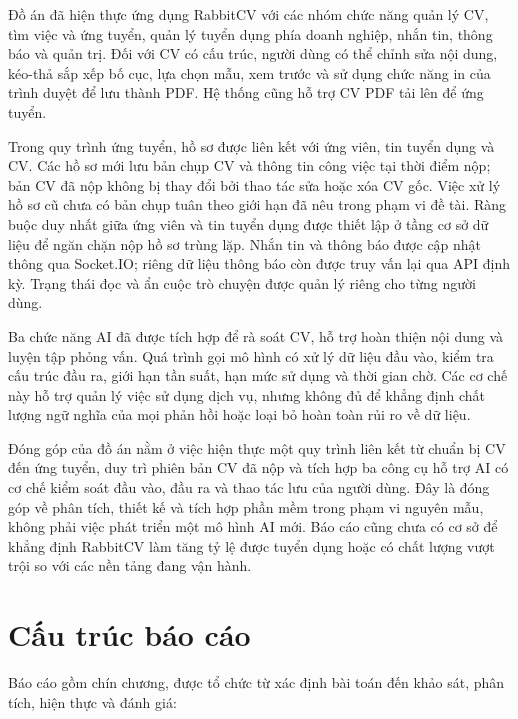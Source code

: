 Đồ án đã hiện thực ứng dụng RabbitCV với các nhóm chức năng quản lý CV, tìm việc và ứng tuyển, quản lý tuyển dụng phía doanh nghiệp, nhắn tin, thông báo và quản trị. Đối với CV có cấu trúc, người dùng có thể chỉnh sửa nội dung, kéo-thả sắp xếp bố cục, lựa chọn mẫu, xem trước và sử dụng chức năng in của trình duyệt để lưu thành PDF. Hệ thống cũng hỗ trợ CV PDF tải lên để ứng tuyển.

Trong quy trình ứng tuyển, hồ sơ được liên kết với ứng viên, tin tuyển dụng và CV. Các hồ sơ mới lưu bản chụp CV và thông tin công việc tại thời điểm nộp; bản CV đã nộp không bị thay đổi bởi thao tác sửa hoặc xóa CV gốc. Việc xử lý hồ sơ cũ chưa có bản chụp tuân theo giới hạn đã nêu trong phạm vi đề tài. Ràng buộc duy nhất giữa ứng viên và tin tuyển dụng được thiết lập ở tầng cơ sở dữ liệu để ngăn chặn nộp hồ sơ trùng lặp. Nhắn tin và thông báo được cập nhật thông qua Socket.IO; riêng dữ liệu thông báo còn được truy vấn lại qua API định kỳ. Trạng thái đọc và ẩn cuộc trò chuyện được quản lý riêng cho từng người dùng.

Ba chức năng AI đã được tích hợp để rà soát CV, hỗ trợ hoàn thiện nội dung và luyện tập phỏng vấn. Quá trình gọi mô hình có xử lý dữ liệu đầu vào, kiểm tra cấu trúc đầu ra, giới hạn tần suất, hạn mức sử dụng và thời gian chờ. Các cơ chế này hỗ trợ quản lý việc sử dụng dịch vụ, nhưng không đủ để khẳng định chất lượng ngữ nghĩa của mọi phản hồi hoặc loại bỏ hoàn toàn rủi ro về dữ liệu.

Đóng góp của đồ án nằm ở việc hiện thực một quy trình liên kết từ chuẩn bị CV đến ứng tuyển, duy trì phiên bản CV đã nộp và tích hợp ba công cụ hỗ trợ AI có cơ chế kiểm soát đầu vào, đầu ra và thao tác lưu của người dùng. Đây là đóng góp về phân tích, thiết kế và tích hợp phần mềm trong phạm vi nguyên mẫu, không phải việc phát triển một mô hình AI mới. Báo cáo cũng chưa có cơ sở để khẳng định RabbitCV làm tăng tỷ lệ được tuyển dụng hoặc có chất lượng vượt trội so với các nền tảng đang vận hành.

\section{Cấu trúc báo cáo}

Báo cáo gồm chín chương, được tổ chức từ xác định bài toán đến khảo sát, phân tích, hiện thực và đánh giá:

